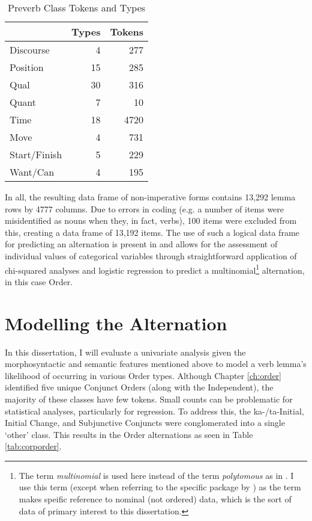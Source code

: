 \begin{table}
\centering
\begin{tabular}{lrr} \\
\toprule
             & Types & Tokens \\
\midrule

Discourse    & 4     & 277    \\
Position     & 15    & 285    \\
Qual         & 30    & 316    \\
Quant        & 7     & 10     \\
Time         & 18    & 4720   \\
Move         & 4     & 731    \\
Start/Finish & 5     & 229    \\
Want/Can     & 4     & 195   \\
\bottomrule
\end{tabular}
\caption{Preverb Class Tokens and Types \label{tab:pv}
}
\end{table}

In all, the resulting data frame of non-imperative forms contains 13,292 lemma rows by 4777 columns. Due to errors in coding (e.g. a number of items were misidentified as nouns when they, in fact, verbs), 100 items were excluded from this, creating a data frame of 13,192 items. The use of such a logical data frame for predicting an alternation is present in \citet{arppe2008univariate} and allows for the assessment of individual values of categorical variables through straightforward application of chi-squared analyses and logistic regression to predict a multinomial\footnote{The term \textit{multinomial} is used here instead of the term \textit{polytomous} as in \citet{arppe2008univariate}. I use this term (except when referring to the specific package by \cite{polytomous}) as the term makes speific reference to nominal (not ordered) data, which is the sort of data of primary interest to this dissertation.} alternation, in this case Order. 

\section{Modelling the Alternation}
In this dissertation, I will evaluate a univariate analysis given the morphosyntactic and semantic features mentioned above to model a verb lemma's likelihood of occurring in various Order types. Although Chapter \ref{ch:order} identified five unique Conjunct Orders (along with the Independent), the majority of these classes have few tokens. Small counts can be problematic for statistical analyses, particularly for regression. To address this, the ka-/ta-Initial, Initial Change, and Subjunctive Conjuncts were conglomerated into  a single `other' class. This results in the Order alternations as seen in Table \ref{tab:corporder}.

